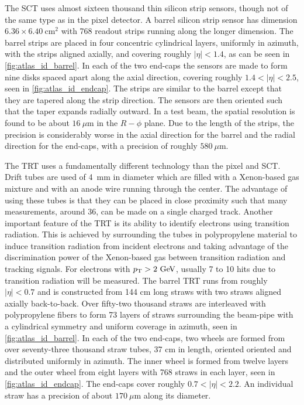 The SCT uses almost sixteen thousand thin silicon strip sensors, though not of the 
same type as in the pixel detector. 
A barrel silicon strip sensor has dimension $6.36\times 6.40~\textrm{cm}^2$
with 768 readout strips running along the longer dimension. The barrel
strips are placed in four concentric cylindrical layers, uniformly in azimuth,
with the strips aligned axially, and covering roughly
$|\eta|<1.4$, as can be seen in \fig\ref{fig:atlas_id_barrel}.
In each of the two end-caps the sensors are made to form nine
disks spaced apart along the axial 
direction, covering roughly $1.4 < |\eta|<2.5$, 
seen in \fig\ref{fig:atlas_id_endcap}. The strips are similar
to the barrel except that they are tapered along the strip direction.
The sensors are then oriented such that the taper expands radially outward.
In a test beam, the spatial resolution is found to be about $16~\mu\textrm{m}$
in the $R-\phi$ plane. Due to the length of the strips, the precision is considerably
worse in the axial direction for the barrel and the radial direction for 
the end-caps, with a precision of roughly $580~\mu\textrm{m}$.


The TRT uses a fundamentally different technology 
than the pixel and SCT.
Drift tubes are used of 4~mm in diameter 
which are filled with a Xenon-based gas mixture
and with an anode wire running through the center.
The advantage of using these tubes is that they can be placed in close
proximity such that many measurements, around 36,
can be made on a single charged track. Another important feature
of the TRT is its ability to identify electrons using transition radiation.
This is achieved by surrounding the tubes in polypropylene material to induce
transition radiation from incident electrons and taking advantage
of the discrimination power of the Xenon-based gas between 
transition radiation and tracking signals.
For electrons with $\pt>2\GeV$, usually 7 to 10 hits due to transition
radiation will be measured.
The barrel TRT runs from roughly $|\eta|<0.7$ and
is constructed from 144 cm long straws with two straws aligned
axially back-to-back. Over fifty-two thousand straws are interleaved
with polypropylene fibers to form 73 layers of straws surrounding the beam-pipe with
a cylindrical symmetry and uniform coverage in azimuth,
seen in \fig\ref{fig:atlas_id_barrel}.
In each of the two end-caps, two wheels are formed from over seventy-three
thousand straw tubes, 37 cm in length, 
oriented oriented and distributed uniformly in azimuth. 
The inner wheel is formed from twelve layers and the outer wheel from eight
layers with 768 straws in each layer, seen in \fig\ref{fig:atlas_id_endcap}.
The end-caps cover roughly $0.7<|\eta|<2.2$.
An individual straw has a precision of about $170~\mu\textrm{m}$ along
its diameter.




